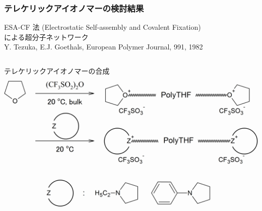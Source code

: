 \documentclass[unicode,12pt]{beamer}%
\begin{document}
\begin{frame}
    \frametitle{テレケリックアイオノマーの検討結果}
    
    ESA-CF 法 (Electrostatic Self-assembly and Covalent Fixation)\\による超分子ネットワーク\\
    {\scriptsize Y. Tezuka, E.J. Goethals, European Polymer Journal, 991, 1982}
    
    \begin{columns}[T, totalwidth=\linewidth]
        {\scriptsize テレケリックアイオノマーの合成}
        \includegraphics[width=\columnwidth]{Telechelic_Anion_2.png}
        

\end{columns}
\end{frame}
\end{document}
